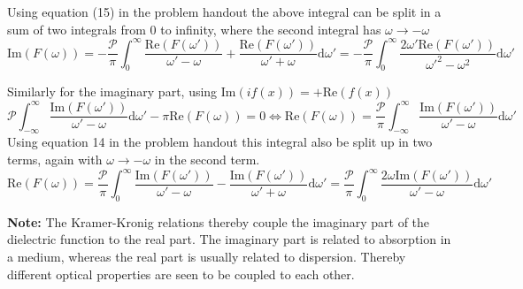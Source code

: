 \begin{solution}
\begin{equation}
 \end{equation}
 Using equation (15) in the problem handout the above integral can be split in a sum of two integrals from 0 to infinity, where the second integral has $\omega \rightarrow - \omega$
 \begin{equation}
     \text{Im}(F(\omega)) = -\frac{\mathcal{P}}{\pi} \int_{0}^{\infty} \frac{\text{Re}(F(\omega'))}{\omega'-\omega} + \frac{\text{Re}(F(\omega'))}{\omega'+\omega} \text{d} \omega' = -\frac{\mathcal{P}}{\pi} \int_{0}^{\infty} \frac{2 \omega' \text{Re}( F(\omega'))}{\omega'^2-\omega^2} \text{d} \omega'
 \end{equation}
 
 
 
 
 Similarly for the imaginary part, using $\text{Im}(i f(x)) = +\text{Re}(f(x))$
 \begin{equation}
     \mathcal{P} \int_{-\infty}^{\infty} \frac{\text{Im}(F(\omega'))}{\omega'-\omega} \text{d} \omega' - \pi \text{Re}(F(\omega)) = 0 \Leftrightarrow \text{Re}(F(\omega)) = \frac{\mathcal{P}}{\pi} \int_{-\infty}^{\infty} \frac{\text{Im}(F(\omega'))}{\omega'-\omega} \text{d} \omega'
 \end{equation}
 Using equation 14 in the problem handout this integral also be split up in two terms, again with $\omega \rightarrow - \omega$ in the second term.
 \begin{equation}
     \text{Re}(F(\omega)) = \frac{\mathcal{P}}{\pi} \int_{0}^{\infty} \frac{\text{Im}(F(\omega'))}{\omega'-\omega} - \frac{\text{Im}(F(\omega'))}{\omega'+\omega}\text{d} \omega' =\frac{\mathcal{P}}{\pi} \int_{0}^{\infty} \frac{2 \omega \text{Im}(F(\omega'))}{\omega'-\omega} \text{d} \omega'
 \end{equation}
 
 \textbf{Note:} The Kramer-Kronig relations thereby couple the imaginary part of the dielectric function to the real part. The imaginary part is related to absorption in a medium, whereas the real part is usually related to dispersion. Thereby different optical properties are seen to be coupled to each other.
\end{solution}



\newpage
